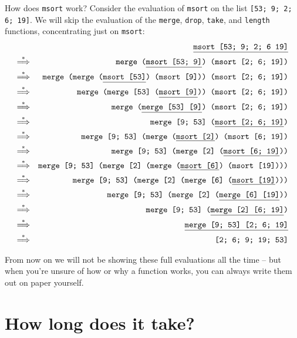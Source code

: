 \documentclass[]{book}
\begin{document}
How does \texttt{msort} work? Consider the evaluation of \texttt{msort} on the list \texttt{[53; 9; 2; 6; 19]}. We will skip the evaluation of the \texttt{merge}, \texttt{drop}, \texttt{take}, and \texttt{length} functions, concentrating just on \texttt{msort}:
\begin{eqnarray*}
 & & \underline{\texttt{msort [53; 9; 2; 6 19]\vphantom{g}}} \\
 \overset{*}\Longrightarrow & & \texttt{merge (\underline{msort [53; 9]\vphantom{g}}) (msort [2; 6; 19])} \\
 \overset{*}\Longrightarrow & & \texttt{merge (merge (\underline{msort [53]\vphantom{g}}) (msort [9])) (msort [2; 6; 19])} \\
\overset{*}\Longrightarrow & & \texttt{merge (merge [53] (\underline{msort [9]\vphantom{g}})) (msort [2; 6; 19])} \\
\overset{*}\Longrightarrow & & \texttt{merge (\underline{merge [53] [9]}) (msort [2; 6; 19])} \\
\overset{*}\Longrightarrow & & \texttt{merge [9; 53] (\underline{msort [2; 6; 19]})} \\
\overset{*}\Longrightarrow & & \texttt{merge [9; 53] (merge (\underline{msort [2]}) (msort [6; 19])} \\
\overset{*}\Longrightarrow & & \texttt{merge [9; 53] (merge [2] (\underline{msort [6; 19]}))} \\
\overset{*}\Longrightarrow & & \texttt{merge [9; 53] (merge [2] (merge (\underline{msort [6]}) (msort [19])))} \\
\overset{*}\Longrightarrow & & \texttt{merge [9; 53] (merge [2] (merge [6] (\underline{msort [19]})))} \\
\overset{*}\Longrightarrow & & \texttt{merge [9; 53] (merge [2] (\underline{merge [6] [19]}))} \\
\overset{*}\Longrightarrow & & \texttt{merge [9; 53] (\underline{merge [2] [6; 19]})} \\
\overset{*}\Longrightarrow & & \texttt{\underline{merge [9; 53] [2; 6; 19]}} \\
\overset{*}\Longrightarrow & & \texttt{[2; 6; 9; 19; 53]}
\end{eqnarray*}

\noindent From now on we will not be showing these full evaluations all the time -- but when you're unsure of how or why a function works, you can always write them out on paper yourself.

\section*{How long does it take?}
\end{document}
